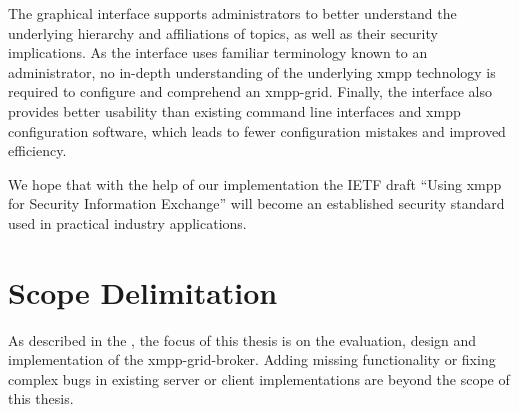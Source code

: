 The graphical interface supports administrators to better understand the underlying hierarchy and affiliations of \glspl{topic}, as well as their security implications.
As the interface uses familiar terminology known to an administrator, no in-depth understanding of the underlying \gls{xmpp} technology is required to configure and comprehend an \gls{xmpp-grid}.
Finally, the interface also provides better usability than existing command line interfaces and \gls{xmpp} configuration software, which leads to fewer configuration mistakes and improved efficiency.

We hope that with the help of our implementation the IETF draft ``Using \gls{xmpp} for Security Information Exchange'' will become an established security standard used in practical industry applications.

\section{Scope Delimitation} %
As described in the , the focus of this thesis is on the evaluation, design and implementation of the \gls{xmpp-grid-broker}.
Adding missing functionality or fixing complex bugs in existing server or client implementations are beyond the scope of this thesis.
